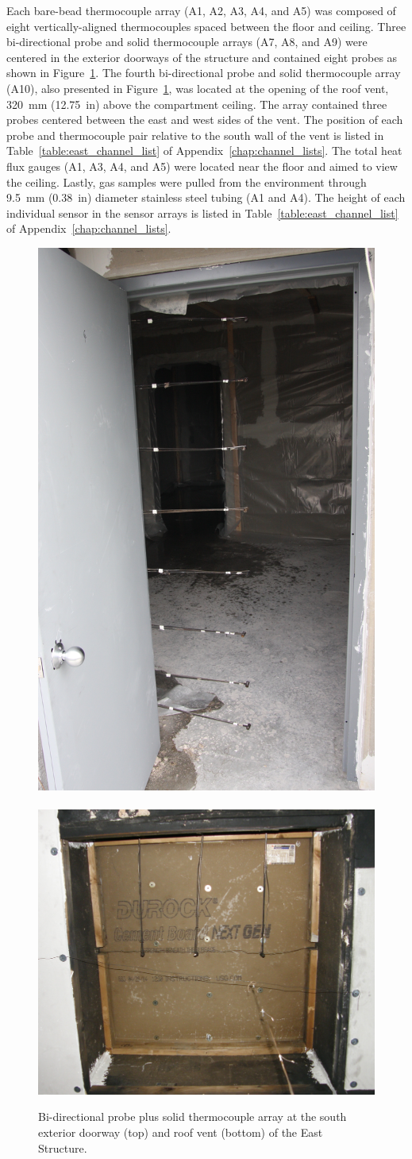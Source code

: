 Each bare-bead thermocouple array (A1, A2, A3, A4, and A5) was composed of eight vertically-aligned thermocouples spaced between the floor and ceiling. Three bi-directional probe and solid thermocouple arrays (A7, A8, and A9) were centered in the exterior doorways of the structure and contained eight probes as shown in Figure~\ref{fig:BDP_arrays}. The fourth bi-directional probe and solid thermocouple array (A10), also presented in Figure~\ref{fig:BDP_arrays}, was located at the opening of the roof vent, 320~mm (12.75~in) above the compartment ceiling. The array contained three probes centered between the east and west sides of the vent. The position of each probe and thermocouple pair relative to the south wall of the vent is listed in Table~\ref{table:east_channel_list} of Appendix~\ref{chap:channel_lists}. The total heat flux gauges (A1, A3, A4, and A5) were located near the floor and aimed to view the ceiling. Lastly, gas samples were pulled from the environment through 9.5~mm (0.38~in) diameter stainless steel tubing (A1 and A4). The height of each individual sensor in the sensor arrays is listed in Table~\ref{table:east_channel_list} of Appendix~\ref{chap:channel_lists}.

\begin{figure}[!h]
	\centering
	\includegraphics[width=0.35\columnwidth]{Figures/Pictures/doorway_BDPs}
	\\~\\
	\includegraphics[width=0.55\columnwidth]{Figures/Pictures/roof_vent_BDPs}
	\caption[Bi-directional probe plus solid thermocouple arrays in East Structure]{Bi-directional probe plus solid thermocouple array at the south exterior doorway (top) and roof vent (bottom) of the East Structure.}
	\label{fig:BDP_arrays}
\end{figure}
\FloatBarrier
